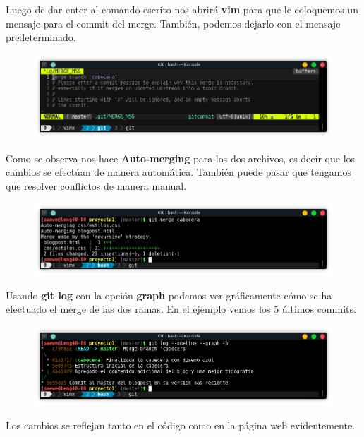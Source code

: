 \documentclass{article}
\begin{document}
Luego de dar enter al comando escrito nos abrirá \textbf{vim} para que le
coloquemos un mensaje para el commit del merge. También, podemos dejarlo con el
mensaje predeterminado.

\begin{figure}[h!]
  \centering
  \includegraphics[scale=0.75]{./Pictures/160_git_merge_message.png}
\end{figure}

Como se observa nos hace \textbf{Auto-merging} para los dos archivos, es decir
que los cambios se efectúan de manera automática. También puede pasar que
tengamos que resolver conflictos de manera manual.

\begin{figure}[h!]
  \centering
  \includegraphics[scale=0.75]{./Pictures/161_git_merge_ok.png}
\end{figure}

Usando \textbf{git log} con la opción \textbf{graph} podemos ver gráficamente
cómo se ha efectuado el merge de las dos ramas. En el ejemplo vemos los 5
últimos commits.

\begin{figure}[h!]
  \centering
  \includegraphics[scale=0.75]{./Pictures/162_git_merge_graph.png}
\end{figure}

Los cambios se reflejan tanto en el código como en la página web evidentemente.
\end{document}
